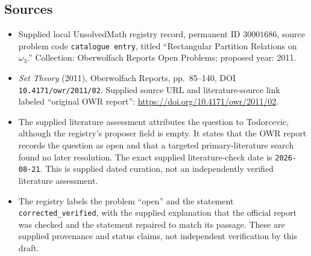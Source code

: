 \documentclass[11pt]{article}
\begin{document}
\subsection{Sources}
\begin{itemize}
\item Supplied local UnsolvedMath registry record, permanent ID \(30001686\), source problem code \texttt{catalogue entry}, titled ``Rectangular Partition Relations on \(\omega_3\).'' Collection: Oberwolfach Reports Open Problems; proposed year: 2011.
\item \emph{Set Theory} (2011), Oberwolfach Reports, pp.\ 85--140, DOI \texttt{10.4171/owr/2011/02}. Supplied source URL and literature-source link labeled ``original OWR report'': \url{https://doi.org/10.4171/owr/2011/02}.
\item The supplied literature assessment attributes the question to Todorcevic, although the registry's proposer field is empty. It states that the OWR report records the question as open and that a targeted primary-literature search found no later resolution. The exact supplied literature-check date is \texttt{2026-08-21}. This is supplied dated curation, not an independently verified literature assessment.
\item The registry labels the problem ``open'' and the statement \texttt{corrected\_verified}, with the supplied explanation that the official report was checked and the statement repaired to match its passage. These are supplied provenance and status claims, not independent verification by this draft.
\end{itemize}
\end{document}
